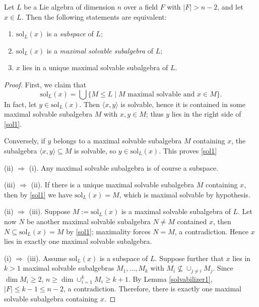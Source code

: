 \documentclass[10pt,a4paper]{amsart}
\def\sol{\mathrm{sol}}
\begin{document}
\begin{lemma}\label{solvabilizer1}
Let $L$ be a Lie algebra of dimension $n$ over a field $F$ with $|F|> n-2$, and let $x\in L$. Then the following statements are equivalent:
\begin{enumerate}[\rm(i)]
  \item $\sol_L(x)$ is a \emph{subspace} of $L$;
  \item $\sol_L(x)$ is a \emph{maximal solvable subalgebra} of $L$;
  \item $x$ lies in a unique maximal solvable subalgebra of $L$.
\end{enumerate}
\end{lemma}

\begin{proof}
First, we claim that
\begin{equation}\label{sol1}
\sol_L(x) = \bigcup\big\{M\le L \mid M \text{ maximal solvable and } x\in M \big\}.
\end{equation}
In fact, let $y\in \sol_L(x)$. Then $\langle x,y\rangle$ is solvable, hence it is contained in some
maximal solvable subalgebra $M$ with $x,y\in M$; thus $y$ lies in the right side of \eqref{sol1}.

Conversely, if $y$ belongs to a maximal solvable subalgebra $M$ containing $x$, the subalgebra $\langle x, y\rangle\subseteq M$ is solvable, so $y\in\sol_L(x)$. This proves \eqref{sol1}
\medskip

\noindent\rm{(ii) $\Rightarrow$ (i).} Any maximal solvable subalgebra is of course a subspace.
\medskip

\noindent\rm{(iii) $\Rightarrow$ (ii).} If there is a unique maximal solvable subalgebra $M$
containing $x$, then by \eqref{sol1} we have $\sol_L(x)=M$, which is maximal solvable by hypothesis.
\medskip

\noindent\rm{(ii) $\Rightarrow$ (iii).} Suppose $M:=\sol_L(x)$ is a maximal solvable subalgebra of $L$. Let now $N$ be another maximal solvable subalgebra $N\neq M$ contained $x$, then $N \subseteq \sol_L(x) = M$ by \eqref{sol1}; maximality forces
$N=M$, a contradiction.  Hence $x$ lies in exactly one maximal
solvable subalgebra.
\medskip


\noindent\rm{(i) $\Rightarrow$ (iii).}  Assume $\sol_L(x)$ is a subspace of $L$.  Suppose further that $x$ lies in $k>1$ maximal solvable subalgebras $M_1, \ldots, M_k$ with $M_i \not\subseteq \cup_{j\neq i} M_j$. Since $\dim M_i\geq 2$, $n\geq \dim \cup_{i=1}^kM_i\geq k+1$. By Lemma \ref{solvabilizer1}, $|F|\leq k-1\leq n-2$, a contradiction. Therefore, there is exactly one maximal solvable subalgebra containing $x$.
\end{proof}
\end{document}
